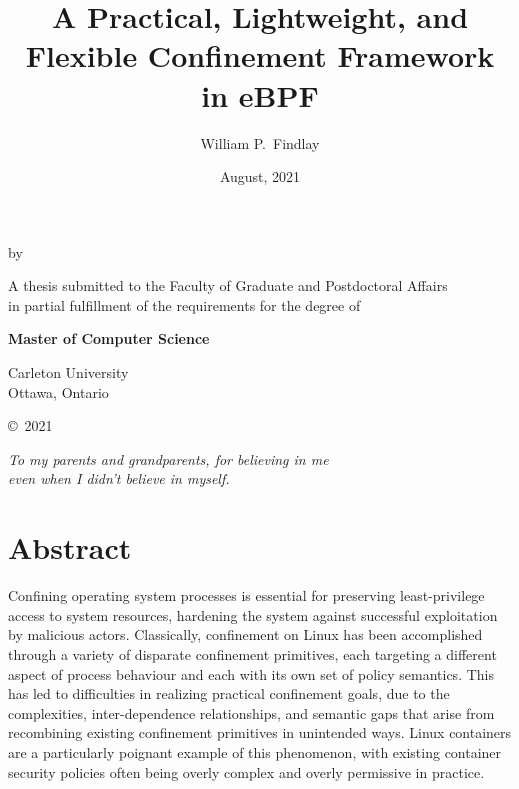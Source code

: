 \documentclass[
  fontsize=12pt,
  titlepage=firstiscover,
  paper=letter,
oneside,
  cleardoublepage=plain,
  parskip=half-,
  DIV=10,
  parindent,
  appendixprefix,
  chapterprefix,
  listof=totoc,
]{scrbook}
\title{A Practical, Lightweight, and Flexible Confinement Framework in eBPF}
\author{William P.\ Findlay}
\date{August, 2021}
\begin{document}
\makeatletter
\begin{titlepage}
    \begin{center}
      \vspace*{1cm}
      {\LARGE\bfseries \@title}

      \vspace{1cm}
      by
      \vspace{1cm}

      {\itshape\large \@author\/}

      \vfill

      A thesis submitted to the Faculty of Graduate and Postdoctoral Affairs\\
      in partial fulfillment of the requirements for the degree of

      \vspace{3cm}
      {\bfseries Master of Computer Science}
      \vspace{3cm}


      {\@date}
      \vspace{0.5cm}

      Carleton University\\
      Ottawa, Ontario
      \vspace{0.5cm}

      \copyright{}~2021 \@author \end{center}
\end{titlepage}
\makeatother
\cleardoublepage

\renewcommand*{\titlepagestyle}{plain}

\frontmatter

\vspace*{6em}
\begin{center}
\textit{To my parents and grandparents, for believing in me\\even when I didn't believe in myself.}
\end{center}
\vspace*{\fill}

\chapter*{Abstract}\begingroup
\small
Confining operating system processes is essential for preserving least-privilege access to
system resources, hardening the system against successful exploitation by malicious
actors. Classically, confinement on Linux has been accomplished through a variety of
disparate confinement primitives, each targeting a different aspect of process behaviour
and each with its own set of policy semantics. This has led to difficulties in realizing
practical confinement goals, due to the complexities, inter-dependence relationships, and
semantic gaps that arise from recombining existing confinement primitives in unintended
ways. Linux containers are a particularly poignant example of this phenomenon, with
existing container security policies often being overly complex and overly permissive in
practice.
\end{document}
